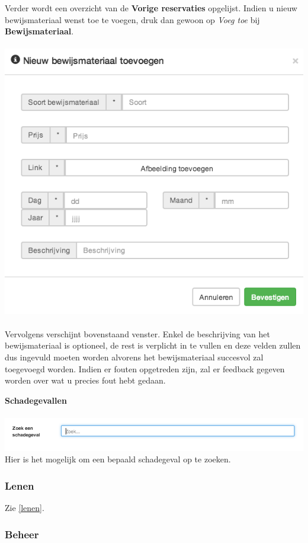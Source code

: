 \documentclass[11pt,a4paper,oneside]{article}
\begin{document}
Verder wordt een overzicht van de \textbf{Vorige reservaties} opgelijst. Indien u nieuw bewijsmateriaal wenst toe te voegen, druk dan gewoon op \textit{Voeg toe} bij \textbf{Bewijsmateriaal}. \\\\
\includegraphics[scale=0.75]{img/nieuwbewijsmateriaaltoevoegen} \\\\
Vervolgens verschijnt bovenstaand venster. Enkel de beschrijving van het bewijsmateriaal is optioneel, de rest is verplicht in te vullen en deze velden zullen dus ingevuld moeten worden alvorens het bewijsmateriaal succesvol zal toegevoegd worden. Indien er fouten opgetreden zijn, zal er feedback gegeven worden over wat u precies fout hebt gedaan.

{\large{\textbf{Schadegevallen}}} \\\\
\includegraphics{zoekeenschadegeval}
Hier is het mogelijk om een bepaald schadegeval op te zoeken.
\subsubsection{Lenen}
Zie \ref{lenen}.
\subsubsection{Beheer}
\end{document}
